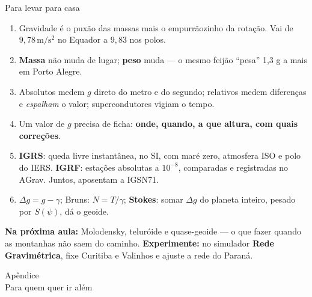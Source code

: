 \documentclass[aspectratio=169,11pt]{beamer}
\newcommand{\bnum}[1]{\textbf{\textcolor{mTeal}{#1}}}
\newcommand{\sist}[1]{\textcolor{corIdeal}{\textbf{#1}}}
\newcommand{\fram}[1]{\textcolor{corMedido}{\textbf{#1}}}
\newcommand{\mss}{\ensuremath{\,\mathrm{m/s^2}}\xspace}
\begin{document}
\begin{frame}{Para levar para casa}
  \footnotesize
  \begin{enumerate}
    \setlength{\itemsep}{1pt}
    \item Gravidade é o puxão das massas mais o empurrãozinho da rotação. Vai de
          $9{,}78$\mss{} no Equador a $9{,}83$ nos polos.
    \item \bnum{Massa} não muda de lugar; \bnum{peso} muda --- o mesmo feijão ``pesa'' 1,3 g
          a mais em Porto Alegre.
    \item Absolutos medem $g$ direto do metro e do segundo; relativos medem diferenças e
          \emph{espalham} o valor; supercondutores vigiam o tempo.
    \item Um valor de $g$ precisa de ficha: \bnum{onde, quando, a que altura, com quais
          correções}.
    \item \sist{IGRS}: queda livre instantânea, no SI, com maré zero, atmosfera ISO e polo do
          IERS. \fram{IGRF}: estações absolutas a $10^{-8}$, comparadas e registradas no
          AGrav. Juntos, aposentam a IGSN71.
    \item $\Delta g = g - \gamma$; Bruns: $N = T/\gamma$; \bnum{Stokes}: somar $\Delta g$ do
          planeta inteiro, pesado por $S(\psi)$, dá o geoide.
  \end{enumerate}
  \begin{ideia}
    \scriptsize \textbf{Na próxima aula:} Molodensky, teluróide e quase-geoide --- o que fazer
    quando as montanhas não saem do caminho. \textbf{Experimente:} no simulador \textbf{Rede
    Gravimétrica}, fixe Curitiba e Valinhos e ajuste a rede do Paraná.
  \end{ideia}
\end{frame}

\appendix

\begin{frame}[standout]
  Apêndice\\[6pt]
  {\normalsize Para quem quer ir além}
\end{frame}
\end{document}
